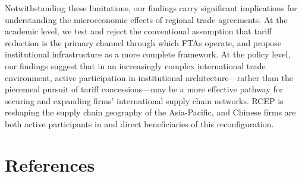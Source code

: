 \documentclass[preprint,12pt,authoryear]{elsarticle}
\begin{document}
Notwithstanding these limitations, our findings carry significant implications for understanding the microeconomic effects of regional trade agreements. At the academic level, we test and reject the conventional assumption that tariff reduction is the primary channel through which FTAs operate, and propose institutional infrastructure as a more complete framework. At the policy level, our findings suggest that in an increasingly complex international trade environment, active participation in institutional architecture—rather than the piecemeal pursuit of tariff concessions—may be a more effective pathway for securing and expanding firms' international supply chain networks. RCEP is reshaping the supply chain geography of the Asia-Pacific, and Chinese firms are both active participants in and direct beneficiaries of this reconfiguration.

\section*{References}
\end{document}
